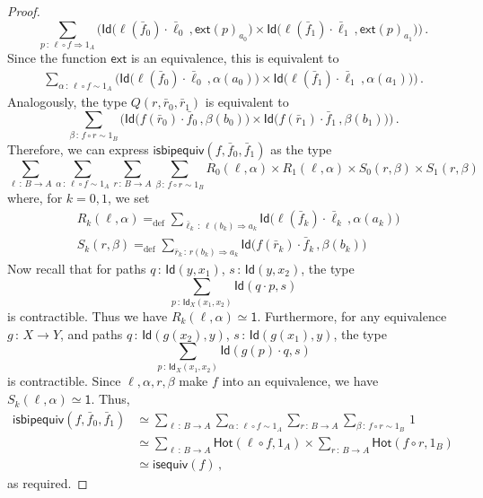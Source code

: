 \documentclass[10pt,a4paper,oneside,reqno]{amsart}
\theoremstyle{mythm}
\theoremstyle{mydef}
\theoremstyle{myrmk}
\newcommand{\defeq}{=_{\mathrm{def}}}
\newcommand{\co}{\,{:}\,}
\newcommand{\com}{\circ}
\newcommand{\ct}{\cdot}
\newcommand{\isequiv}{\mathsf{isequiv}}
\newcommand{\Hot}{\mathsf{Hot}}
\newcommand{\ext}{\mathsf{ext}}
\newcommand{\one}{\mathsf{1}}
\newcommand{\Id}{\mathsf{Id}}
\newcommand{\isbipequiv}{\mathsf{isbipequiv}}
\begin{document}
\begin{proof}
\[
\sum_{ p \co \ell \com f \Rightarrow 1_A} \Big(
\Id  \big( \ell (\bar{f}_0) \ct \bar{\ell}_0 \, ,  \ext(p)_{a_0} \big) 
\times 
\Id \big( \ell(\bar{f}_1) \ct \bar{\ell}_1 \, ,  \ext(p)_{a_1} \big)
\Big) \, .
\]
Since the function $\ext$ is an equivalence, this is equivalent to
\begin{align*}
\sum_{\alpha \co \ell \com f \sim 1_A} 
\Big( \Id  \big( \ell (\bar{f}_0) \ct \bar{\ell}_0 \, ,  \alpha(a_0) \big) 
\times 
\Id \big( \ell(\bar{f}_1) \ct \bar{\ell}_1 \, ,  \alpha(a_1) \big) 
\Big) \, .
\end{align*}
Analogously, the type $Q(r,\bar{r}_0,\bar{r}_1)$ is equivalent to
\[
\sum_{\beta \co f \com r \sim 1_B}
\Big(
\Id  \big( f (\bar{r}_0) \ct \bar{f}_0 \, ,  \beta(b_0) \big) 
\times 
\Id \big( f(\bar{r}_1) \ct \bar{f}_1 \, ,  \beta(b_1) \big)
\Big) \, .
\]
Therefore, we can express $\isbipequiv(f, \bar{f}_0, \bar{f}_1)$ as the type
\[
\sum_{\ell \co B \to  A} 
\sum_{\alpha \co \ell \com f \sim 1_A}
\sum_{ r \co B \to A} 
\sum_{\beta \co f \com r \sim 1_B} 
	R_0(\ell,\alpha) \times R_1(\ell,\alpha) \times S_0(r,\beta) \times S_1(r,\beta)
\]
where, for $k = 0,1$, we set
\begin{align*}
& R_k(\ell,\alpha) \defeq \sum_{\bar{\ell}_k \co \ell(b_k) \Rightarrow a_k} \Id \big( \ell (\bar{f}_k) \ct \bar{\ell}_k \, ,  \alpha(a_k) \big) \\
& S_k(r,\beta) \defeq \sum_{\bar{r}_k \co r(b_k) \Rightarrow a_k} \Id \big( f (\bar{r}_k) \ct \bar{f}_k \, ,  \beta(b_k) \big) 
\end{align*}
Now recall  that for paths $q \co \Id(y,x_1)$, $s \co \Id(y,x_2)$, the type 
\[
\sum_{p \co \Id_X(x_1,x_2)} \Id(q \ct p,s)
\] 
is contractible. Thus we have $R_k(\ell,\alpha) \simeq \one$.
Furthermore, for any equivalence $g \co X \to Y$, and paths $q \co \Id(g(x_2),y)$, $s \co \Id(g(x_1),y)$, the type 
\[
\sum_{p \co \Id_X(x_1,x_2)} \Id(g(p) \ct q,s)
\] is contractible. Since $\ell, \alpha, r, \beta$ make $f$ into an equivalence, we have $S_k(\ell,\alpha) \simeq \one$. Thus,
\begin{align*} 
\isbipequiv(f,\bar{f}_0, \bar{f}_1) 
  & \simeq   \sum_{\ell \co B \to A} \sum_{\alpha \co \ell \com f \sim 1_A} \sum_{ r  \co B \to A} 
 \sum_{\beta \co f \com r \sim 1_B} \, 1 \\
 & \simeq \sum_{\ell \co B \to A}  \Hot( \ell \com f , 1_A ) \times 
\sum_{r  \co B \to A}  \Hot( f \com r, 1_B ) \\
 & \simeq \isequiv(f) \, ,
\end{align*} 
as required.
\end{proof}
\end{document}
